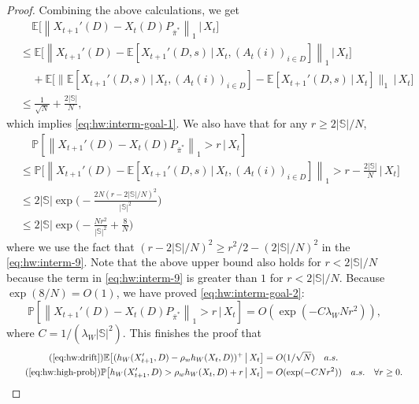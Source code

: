 \documentclass[11pt,letterpaper]{article}
\theoremstyle{plain}
\theoremstyle{definition}
\theoremstyle{remark}
\newcommand{\norm}[1]{\left\lVert#1\right\rVert}
\newcommand{\normbig}[1]{\big\lVert#1\big\rVert}
\newcommand{\E}[1]{\mathbb{E}\left[#1\right]}
\newcommand{\Ebig}[1]{\mathbb{E}\big[#1\big]}
\newcommand{\givenplain}{\,|\,}
\newcommand{\givenbig}{\,\big|\,}
\newcommand{\Probbig}[1]{\mathbb{P}\big[#1\big]}
\newcommand{\Prob}[1]{\mathbb{P}\left[#1\right]}
\newcommand{\sspa}{\mathbb{S}}
\newcommand{\pibar}{{\sysbar{\pi}}}
\newcommand{\pibs}{{\pibar^*}}
\newcommand{\sysbar}[1]{\bar{#1}}
\newcommand{\wmat}{W}
\newcommand{\hw}{h_\wmat}
\newcommand{\lamw}{\lambda_\wmat}
\newcommand{\rhow}{\rho_{w}}
\begin{document}
\begin{proof}
    Combining the above calculations, we get 
    \begin{align}
        \nonumber
        &\mspace{20mu} \Ebig{ \norm{X_{t+1}'(D)- X_t(D) P_{\pibs}}_1 \givenbig X_t} \\
        \nonumber
        &\leq   \Ebig{ \norm{X_{t+1}'(D) - \E{X_{t+1}'(D, s) \givenplain X_t, (A_t(i))_{i\in D}}}_1 \givenbig X_t}  \\
        \nonumber
        &\mspace{20mu} +  \Ebig{\normbig{\E{X_{t+1}'(D, s) \givenplain X_t, (A_t(i))_{i\in D}} - \E{X_{t+1}'(D, s) \givenplain X_t}}_1 \givenbig X_t}  \\
        &\leq \frac{1}{\sqrt{N}} + \frac{2|\sspa|}{N},
    \end{align}
    which implies \eqref{eq:hw:interm-goal-1}. 
    We also have that for any $r\geq 2|\sspa| / N$, 
    \begin{align}
        \nonumber
        &\mspace{20mu} \Prob{\norm{X_{t+1}'(D)- X_t(D) P_{\pibs}}_1 > r \givenbig X_t} \\ 
        \nonumber
        &\leq  \Probbig{ \norm{X_{t+1}'(D) - \E{X_{t+1}'(D, s) \givenplain X_t, (A_t(i))_{i\in D}}}_1 > r - \frac{2|\sspa|}{N} \givenbig X_t} \\
        \nonumber
        &\leq 2|\sspa| \exp\Big(-\frac{2N (r-2|\sspa|/N)^2}{|\sspa|^2}\Big) \\
        \label{eq:hw:interm-9}
        &\leq 2|\sspa| \exp\Big(-\frac{N r^2}{|\sspa|^2} + \frac{8}{N}\Big)
    \end{align}
    where we use the fact that $(r - 2|\sspa|/N)^2 \geq r^2 / 2 - (2|\sspa|/N)^2$ in the \eqref{eq:hw:interm-9}.  
    Note that the above upper bound also holds for $r< 2|\sspa| / N$ because the term in \eqref{eq:hw:interm-9} is greater than $1$ for $r < 2|\sspa| / N$. Because $\exp(8/N) = O(1)$, we have proved \eqref{eq:hw:interm-goal-2}:
    \[
         \Prob{\norm{X_{t+1}'(D)- X_t(D) P_{\pibs}}_1 > r \givenbig X_t} = O(\exp(-C\lamw Nr^2)),
    \]
    where $C = 1/ (\lamw |\sspa|^2)$. This finishes the proof that
    \begin{align}
        \tag{\ref{eq:hw:drift}}
        \Ebig{(\hw(X_{t+1}', D) - \rhow \hw(X_t, D))^+ \givenbig X_t} &= O(1/\sqrt{N}) \quad a.s. \\
        \tag{\ref{eq:hw:high-prob}}
        \Probbig{\hw(X_{t+1}', D) > \rhow \hw(X_t, D) + r   \givenbig X_t} &= O(\exp(-C N r^2)) \quad a.s. \quad \forall r \geq 0.
    \end{align}


\end{proof}
\end{document}
